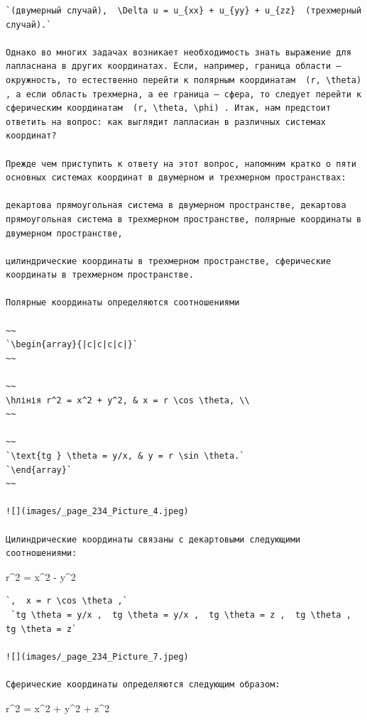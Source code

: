 \documentclass[
  ukrainian,
]{article}
\begin{document}
\begin{verbatim}
`(двумерный случай),  \Delta u = u_{xx} + u_{yy} + u_{zz}  (трехмерный случай).`

Однако во многих задачах возникает необходимость знать выражение для лапласнана в других координатах. Если, например, граница области — окружность, то естественно перейти к полярным координатам  (r, \theta) , а если область трехмерна, а ее граница — сфера, то следует перейти к сферическим координатам  (r, \theta, \phi) . Итак, нам предстоит ответить на вопрос: как выглядит лапласиан в различных системах координат?

Прежде чем приступить к ответу на этот вопрос, напомним кратко о пяти основных системах координат в двумерном и трехмерном пространствах:

декартова прямоугольная система в двумерном пространстве, декартова прямоугольная система в трехмерном пространстве, полярные координаты в двумерном пространстве,

цилиндрические координаты в трехмерном пространстве, сферические координаты в трехмерном пространстве.

Полярные координаты определяются соотношениями

~~
`\begin{array}{|c|c|c|c|}`
~~

~~
\hлінія r^2 = x^2 + y^2, & x = r \cos \theta, \\
~~

~~
`\text{tg } \theta = y/x, & y = r \sin \theta.`
`\end{array}`
~~

![](images/_page_234_Picture_4.jpeg)

Цилиндрические координаты связаны с декартовыми следующими соотношениями:
\end{verbatim}

r\^{}2 = x\^{}2 - y\^{}2

\begin{verbatim}
`,  x = r \cos \theta ,`
 `tg \theta = y/x ,  tg \theta = y/x ,  tg \theta = z ,  tg \theta ,  tg \theta = z`

![](images/_page_234_Picture_7.jpeg)

Сферические координаты определяются следующим образом:
\end{verbatim}

r\^{}2 = x\^{}2 + y\^{}2 + z\^{}2
\end{document}

